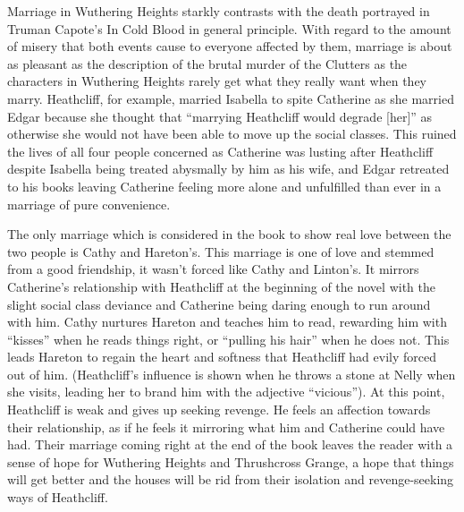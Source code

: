 \documentclass[a4paper]{article}
\begin{document}
Marriage in Wuthering Heights starkly contrasts with the death portrayed in Truman Capote's In Cold Blood in general principle. With regard to the amount of misery that both events cause to everyone affected by them, marriage is about as pleasant as the description of the brutal murder of the Clutters as the characters in Wuthering Heights rarely get what they really want when they marry. Heathcliff, for example, married Isabella to spite Catherine as she married Edgar because she thought that ``marrying Heathcliff would degrade [her]'' as otherwise she would not have been able to move up the social classes. This ruined the lives of all four people concerned as Catherine was lusting after Heathcliff despite Isabella being treated abysmally by him as his wife, and Edgar retreated to his books leaving Catherine feeling more alone and unfulfilled than ever in a marriage of pure convenience.

The only marriage which is considered in the book to show real love between the two people is Cathy and Hareton's. This marriage is one of love and stemmed from a good friendship, it wasn't forced like Cathy and Linton's. It mirrors Catherine's relationship with Heathcliff at the beginning of the novel with the slight social class deviance and Catherine being daring enough to run around with him. Cathy nurtures Hareton and teaches him to read, rewarding him with ``kisses'' when he reads things right, or ``pulling his hair'' when he does not. This leads Hareton to regain the heart and softness that Heathcliff had evily forced out of him. (Heathcliff's influence is shown when he throws a stone at Nelly when she visits, leading her to brand him with the adjective ``vicious''). At this point, Heathcliff is weak and gives up seeking revenge. He feels an affection towards their relationship, as if he feels it mirroring what him and Catherine could have had. Their marriage coming right at the end of the book leaves the reader with a sense of hope for Wuthering Heights and Thrushcross Grange, a hope that things will get better and the houses will be rid from their isolation and revenge-seeking ways of Heathcliff.
\end{document}
